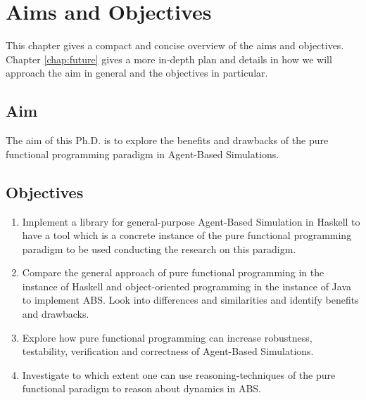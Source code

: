\chapter{Aims and Objectives}
\label{chap:aimsObj}

This chapter gives a compact and concise overview of the aims and objectives. Chapter \ref{chap:future} gives a more in-depth plan and details in how we will approach the aim in general and the objectives in particular.

\section{Aim}
The aim of this Ph.D. is to explore the benefits and drawbacks of the pure functional programming paradigm in Agent-Based Simulations. 

\section{Objectives}
\begin{enumerate}
	\item Implement a library for general-purpose Agent-Based Simulation in Haskell to have a tool which is a concrete instance of the pure functional programming paradigm to be used conducting the research on this paradigm.

	\item Compare the general approach of pure functional programming in the instance of Haskell and object-oriented programming in the instance of Java to implement ABS. Look into differences and similarities and identify benefits and drawbacks.

	\item Explore how pure functional programming can increase robustness, testability, verification and correctness of Agent-Based Simulations.

	\item Investigate to which extent one can use reasoning-techniques of the pure functional paradigm to reason about dynamics in ABS.
\end{enumerate}